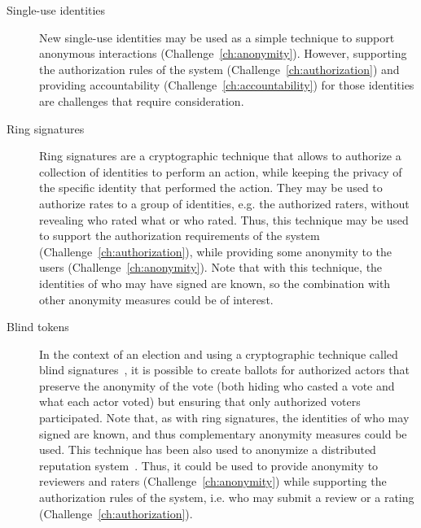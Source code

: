 \begin{description}
\item[Single-use identities] New single-use identities may be used as a simple
  technique to support anonymous interactions (Challenge~\ref{ch:anonymity}).
  However, supporting the authorization rules of the system
  (Challenge~\ref{ch:authorization}) and providing accountability
  (Challenge~\ref{ch:accountability}) for those identities are challenges that
  require consideration.

\item[Ring signatures] Ring signatures \cite{rivest2001leak} are a cryptographic
  technique that allows to authorize a collection of identities to perform an
  action, while keeping the privacy of the specific identity that performed the
  action. They may be used to authorize rates to a group of identities, e.g. the
  authorized raters, without revealing who rated what or who rated. Thus, this
  technique may be used to support the authorization requirements of the system
  (Challenge~\ref{ch:authorization}), while providing some anonymity to the
  users (Challenge~\ref{ch:anonymity}). Note that with this technique, the
  identities of who may have signed are known, so the combination with other
  anonymity measures could be of interest.

\item[Blind tokens] In the context of an election and using a cryptographic
  technique called blind signatures~\cite{chaum1983blind}, it is possible to
  create ballots for authorized actors that preserve the anonymity of the vote
  (both hiding who casted a vote and what each actor voted) but ensuring that
  only authorized voters participated. Note that, as with ring signatures, the
  identities of who may signed are known, and thus complementary anonymity
  measures could be used. This technique has been also used to anonymize a
  distributed reputation system~\cite{schaub2016trustless}. Thus, it could be
  used to provide anonymity to reviewers and raters
  (Challenge~\ref{ch:anonymity}) while supporting the authorization rules of the
  system, i.e. who may submit a review or a rating
  (Challenge~\ref{ch:authorization}).


\end{description}
